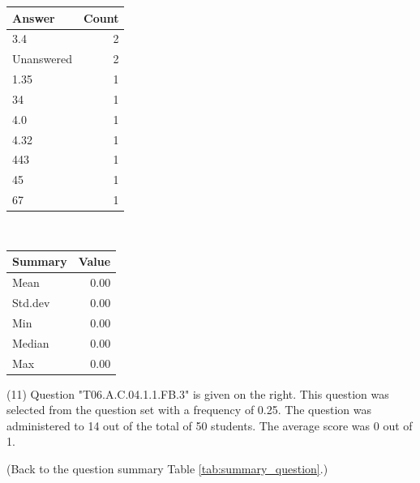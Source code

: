 \documentclass[12pt,english,nohyper]{tufte-handout}\usepackage[]{graphicx}\usepackage[]{color}
\begin{document}
\begin{center}%
\begin{tabular}{lr}
  \hline
Answer & Count \\ 
  \hline
3.4 &   2 \\ 
  Unanswered &   2 \\ 
  1.35 &   1 \\ 
  34 &   1 \\ 
  4.0 &   1 \\ 
  4.32 &   1 \\ 
  443 &   1 \\ 
  45 &   1 \\ 
  67 &   1 \\ 
   \hline
\end{tabular}
~~~~~~~~%
\begin{tabular}{lr}
  \hline
Summary & Value \\ 
  \hline
Mean & 0.00 \\ 
  Std.dev & 0.00 \\ 
  Min & 0.00 \\ 
  Median & 0.00 \\ 
  Max & 0.00 \\ 
   \hline
\end{tabular}
\end{center}\newpage{} (11) Question "T06.A.C.04.1.1.FB.3" is given on the right. This question was selected from the question set with a frequency of 0.25. The question was administered to 14 out of the total of 50 students. The average score was 0 out of 1.

 (Back to the question summary Table \ref{tab:summary_question}.)
\end{document}
